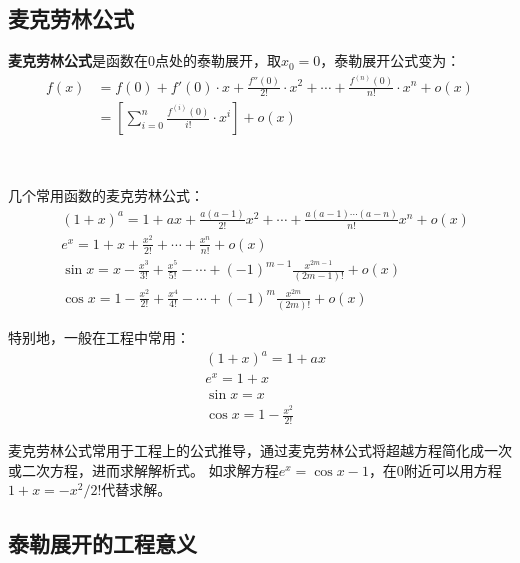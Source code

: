 \subsection{麦克劳林公式}

\begin{definition}
{\bf 麦克劳林公式}是函数在0点处的泰勒展开，取$x_0=0$，泰勒展开公式变为：
\begin{align*}
f\left( x \right) &=f\left( 0 \right) +f'\left( 0 \right) \cdot x+\frac{f''\left( 0 \right)}{2!}\cdot x^2+\cdots +\frac{f^{\left( n \right)}\left( 0 \right)}{n!}\cdot x^n+o\left( x \right) \\
&=\left[ \sum_{i=0}^n{\frac{f^{\left( i \right)}\left( 0 \right)}{i!}\cdot x^i} \right] +o\left( x \right)
\end{align*}
\end{definition}

~

几个常用函数的麦克劳林公式：
\begin{align*}
&\left( 1+x \right) ^a=1+ax+\frac{a\left( a-1 \right)}{2!}x^2+\cdots +\frac{a\left( a-1 \right) \cdots \left( a-n \right)}{n!}x^n+o\left( x \right) \\
&e^x=1+x+\frac{x^2}{2!}+\cdots +\frac{x^n}{n!}+o\left( x \right) \\
&\sin x=x-\frac{x^3}{3!}+\frac{x^5}{5!}-\cdots +\left( -1 \right) ^{m-1}\frac{x^{2m-1}}{\left( 2m-1 \right) !}+o\left( x \right) \\
&\cos x=1-\frac{x^2}{2!}+\frac{x^4}{4!}-\cdots +\left( -1 \right) ^m\frac{x^{2m}}{\left( 2m \right) !}+o\left( x \right)
\end{align*}

特别地，一般在工程中常用：
\begin{align*}
&\left( 1+x \right) ^a=1+ax \\
&e^x=1+x \\
&\sin x=x \\
&\cos x=1-\frac{x^2}{2!}
\end{align*}

麦克劳林公式常用于工程上的公式推导，通过麦克劳林公式将超越方程简化成一次或二次方程，进而求解解析式。
如求解方程$e^x=\cos x-1$，在0附近可以用方程$1+x=-x^2/2!$代替求解。

\subsection{泰勒展开的工程意义}

